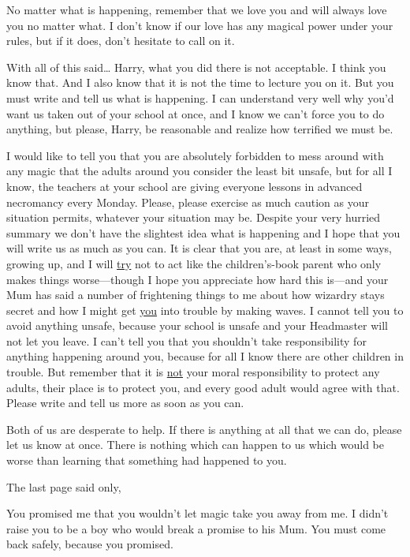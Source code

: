 \begin{writtenNote}
No matter what is happening, remember that we love you and will always
love you no matter what. I don't know if our love has any magical power under
your rules, but if it does, don't hesitate to call on it.

With all of this said{\ldots} Harry, what you did there is not
acceptable. I think you know that. And I also know that it is not the time to
lecture you on it. But you must write and tell us what is happening. I can
understand very well why you'd want us taken out of your school at once, and I
know we can't force you to do anything, but please, Harry, be reasonable and
realize how terrified we must be.

I would like to tell you that you are absolutely forbidden to mess around
with any magic that the adults around you consider the least bit unsafe, but
for all I know, the teachers at your school are giving everyone lessons in
advanced necromancy every Monday. Please, please exercise as much caution as
your situation permits, whatever your situation may be. Despite your very
hurried summary we don't have the slightest idea what is happening and I hope
that you will write us as much as you can. It is clear that you are, at least
in some ways, growing up, and I will \underline{try} not to act like the
children's-book parent who only makes things worse---though I hope you
appreciate how hard this is---and your Mum has said a number of frightening
things to me about how wizardry stays secret and how I might get
\underline{you} into trouble by making waves. I cannot tell you to avoid
anything unsafe, because your school is unsafe and your Headmaster will not let
you leave. I can't tell you that you shouldn't take responsibility for anything
happening around you, because for all I know there are other children in
trouble. But remember that it is \underline{not} your moral responsibility to
protect any adults, their place is to protect you, and every good adult would
agree with that. Please write and tell us more as soon as you can.

Both of us are desperate to help. If there is anything at all that we can
do, please let us know at once. There is nothing which can happen to us which
would be worse than learning that something had happened to you.

\end{writtenNote}

The last page said only,

\begin{writtenNote}
You promised me that you wouldn't let magic take you away from me. I
didn't raise you to be a boy who would break a promise to his Mum. You must
come back safely, because you promised.

\end{writtenNote}


